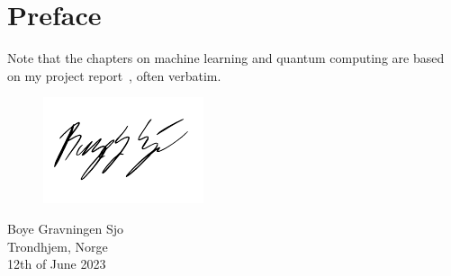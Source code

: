\chapter{Preface}
\lipsum[1]

Note that the chapters on machine learning and quantum computing are based on my project report~\autocite{sjo2021}, often verbatim.

\vspace{1.5cm}
\begin{figure}[h]
    \raggedleft
    \includegraphics[width=0.3\linewidth]{blank.pdf}
\end{figure}
\begin{flushright}
    \vspace{-1.3cm}
    Boye Gravningen Sjo \\
    Trondhjem, Norge \\
    12th of June 2023
\end{flushright}

\cleardoublepage